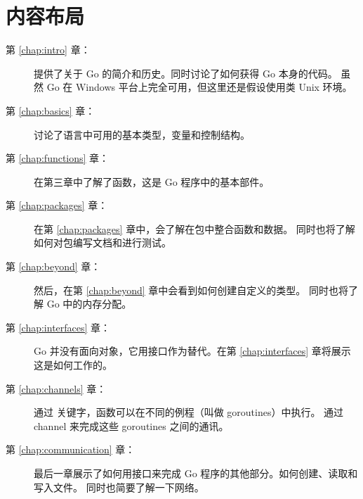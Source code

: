 \section*{内容布局}
\begin{description}
\item[第 \ref{chap:intro} 章：]
提供了关于 Go 的简介和历史。同时讨论了如何获得 Go 本身的代码。
虽然 Go 在 Windows 平台上完全可用，但这里还是假设使用类 Unix 环境。

\item[第 \ref{chap:basics} 章：]
讨论了语言中可用的基本类型，变量和控制结构。

\item[第 \ref{chap:functions} 章：]
在第三章中了解了函数，这是 Go 程序中的基本部件。

\item[第 \ref{chap:packages} 章：]
在第 \ref{chap:packages} 章中，会了解在包中整合函数和数据。
同时也将了解如何对包编写文档和进行测试。

\item[第 \ref{chap:beyond} 章：]
然后，在第 \ref{chap:beyond} 章中会看到如何创建自定义的类型。
同时也将了解 Go 中的内存分配。

\item[第 \ref{chap:interfaces} 章：]
Go 并没有面向对象，它用接口作为替代。在第 \ref{chap:interfaces} 章将展示这是如何工作的。

\item[第 \ref{chap:channels} 章：]
通过  关键字，函数可以在不同的例程（叫做 goroutines）中执行。
通过 channel 来完成这些 goroutines 之间的通讯。

\item[第 \ref{chap:communication} 章：]
最后一章展示了如何用接口来完成 Go 程序的其他部分。如何创建、读取和写入文件。
同时也简要了解一下网络。
\end{description}

